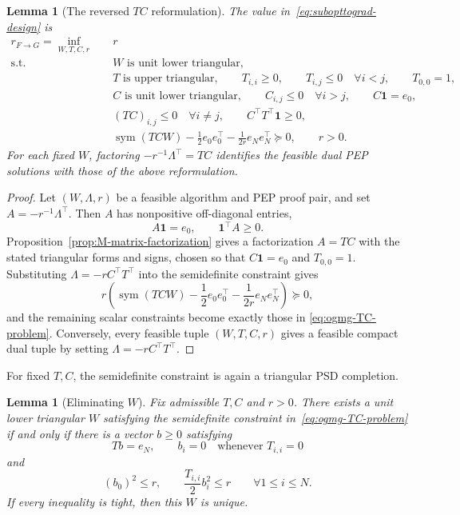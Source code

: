 \documentclass[11pt]{article}
\newtheorem{lemma}[thm]{Lemma}
\begin{document}
\begin{lemma}[The reversed $TC$ reformulation]\label{lem:ogmg-TC}
The value in~\eqref{eq:subopttograd-design} is
\begin{equation}\label{eq:ogmg-TC-problem}
\begin{aligned}
 r_{F\rightarrow G}
 =\inf_{W,T,C,r}\quad &r\\
 \mathrm{s.t.}\quad
 &W\text{ is unit lower triangular},\\
 &T\text{ is upper triangular},\qquad T_{i,i}\geq0,\qquad T_{i,j}\leq0\quad \forall i<j,
 \qquad T_{0,0}=1,\\
 &C\text{ is unit lower triangular},\qquad C_{i,j}\leq0\quad \forall i>j,
 \qquad C\mathbf1=e_0,\\
 &(TC)_{i,j}\leq0\quad \forall i\neq j,\qquad C^\top T^\top\mathbf1\geq0,\\
 &\operatorname{sym}(TCW)
   -\frac12e_0e_0^\top
   -\frac1{2r}e_Ne_N^\top
   \succeq0,
 \qquad r>0.
\end{aligned}
\end{equation}
For each fixed $W$, factoring $-r^{-1}\Lambda^\top=TC$ identifies the feasible dual PEP solutions with those of the above reformulation.
\end{lemma}

\begin{proof}
Let $(W,\Lambda,r)$ be a feasible algorithm and PEP proof pair, and set
$A=-r^{-1}\Lambda^\top$. Then $A$ has nonpositive off-diagonal entries,
\[
    A\mathbf1=e_0,
    \qquad
    \mathbf1^\top A\geq0.
\]
Proposition~\ref{prop:M-matrix-factorization} gives a factorization $A=TC$
with the stated triangular forms and signs, chosen so that
$C\mathbf1=e_0$ and $T_{0,0}=1$. Substituting
$\Lambda=-rC^\top T^\top$ into the semidefinite constraint gives
\[
r\left(
\operatorname{sym}(TCW)
-\frac12e_0e_0^\top
-\frac1{2r}e_Ne_N^\top
\right)\succeq0,
\]
and the remaining scalar constraints become exactly those in
\eqref{eq:ogmg-TC-problem}.
Conversely, every feasible tuple $(W,T,C,r)$ gives a feasible compact dual
tuple by setting $\Lambda=-rC^\top T^\top$.
\end{proof}

For fixed $T,C$, the semidefinite constraint is again a triangular PSD
completion.

\begin{lemma}[Eliminating $W$]\label{lem:ogmg-eliminate-W}
Fix admissible $T,C$ and $r>0$. There exists a unit lower triangular $W$
satisfying the semidefinite constraint in~\eqref{eq:ogmg-TC-problem} if and
only if there is a vector $b\geq0$ satisfying
\begin{equation}\label{eq:ogmg-backward-solution}
    Tb=e_N,
    \qquad
    b_i=0\quad\text{whenever }T_{i,i}=0
\end{equation}
and
\begin{equation}\label{eq:ogmg-diagonal-conditions}
(b_0)^2\leq r,
\qquad
\frac{T_{i,i}}{2}b_i^2\leq r
\qquad \forall 1\leq i\leq N.
\end{equation}
If every inequality is tight, then this $W$ is unique.
\end{lemma}
\end{document}
